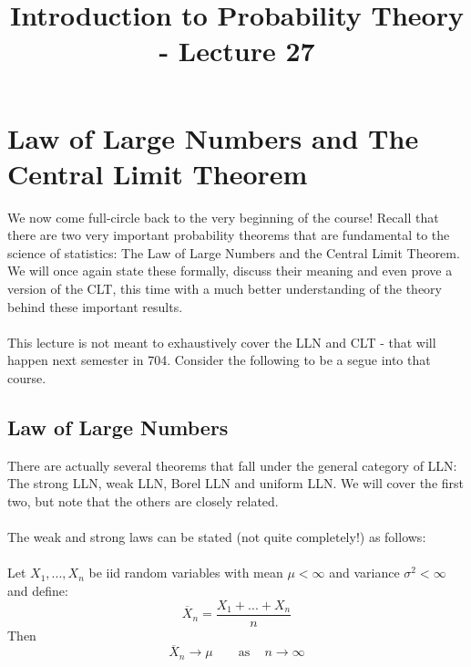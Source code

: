 \documentclass[12pt]{article} %
\date{}
\title{Introduction to Probability Theory - Lecture 27}
\begin{document}
\maketitle

\section{Law of Large Numbers and The Central Limit Theorem}
We now come full-circle back to the very beginning of the course! Recall that there are two very important probability theorems that are fundamental to the science of statistics: The Law of Large Numbers and the Central Limit Theorem. We will once again state these formally, discuss their meaning and even prove a version of the CLT, this time with a much better understanding of the theory behind these important results.\\\\
This lecture is not meant to exhaustively cover the LLN and CLT - that will happen next semester in 704. Consider the following to be a segue into that course.

\subsection{Law of Large Numbers}
There are actually several theorems that fall under the general category of LLN: The strong LLN, weak LLN, Borel LLN and uniform LLN. We will cover the first two, but note that the others are closely related.\\\\
The weak and strong laws can be stated (not quite completely!) as follows:\\\\
Let $X_1,...,X_n$ be iid random variables with mean $\mu<\infty$ and variance $\sigma^2<\infty$ and define:
$$\overline{X}_n = \frac{X_1+...+X_n}{n}$$
Then 
$$\overline{X}_n\rightarrow \mu \;\;\;\;\;\; \textrm{ as } \;\;\; n\rightarrow\infty$$
\end{document}

